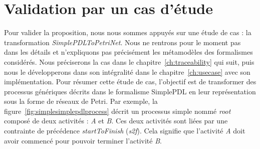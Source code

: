 %    


\section{Validation par un cas d'étude}

Pour valider la proposition, nous nous sommes appuyés sur une étude
de cas : la transformation \emph{SimplePDLToPetriNet}. Nous ne rentrons pour le
moment pas dans les détails et n'expliquons pas précisément les métamodèles des
formalismes considérés. Nous préciserons la cas dans le
chapitre~\ref{ch:traceability} qui suit, puis nous le développerons dans son
intégralité dans le chapitre~\ref{ch:usecase} avec son implémentation. Pour
résumer cette étude de cas, l'objectif est de transformer des processus
génériques décrits dans le formalisme SimplePDL en leur représentation sous la
forme de réseaux de Petri. Par exemple, la
figure~\ref{fig:simplesimplepdlprocess} décrit un processus simple nommé
\emph{root} composé de deux activités : \emph{A} et \emph{B}. Ces deux
activités sont liées par une contrainte de précédence \emph{startToFinish}
(\emph{s2f}). Cela signifie que l'activité \emph{A} doit avoir commencé pour
pouvoir terminer l'activité \emph{B}.


